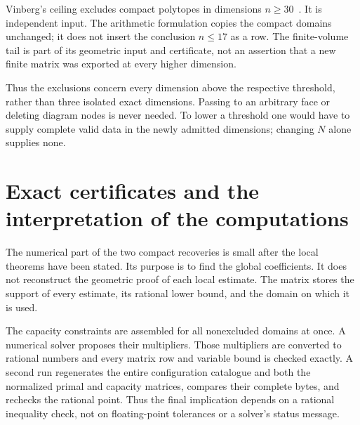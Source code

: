\documentclass[11pt]{article}
\theoremstyle{definition}
\theoremstyle{remark}
\numberwithin{equation}{section}
\begin{document}
Vinberg's ceiling excludes compact polytopes in dimensions
$n\ge30$~\cite{Vinberg1984,Vinberg1985}. It is independent input.
The arithmetic formulation copies the compact domains unchanged;
it does not insert the conclusion $n\le17$ as a row. The
finite-volume tail is part of its geometric input and certificate,
not an assertion that a new finite matrix was exported at every
higher dimension.

Thus the exclusions concern every dimension above the respective
threshold, rather than three isolated exact dimensions. Passing to
an arbitrary face or deleting diagram nodes is never needed.
To lower a threshold one would have to supply complete valid data in
the newly admitted dimensions; changing $N$ alone supplies none.

\section{Exact certificates and the interpretation of the computations}
\label{sec:certificates}

The numerical part of the two compact recoveries is small after the
local theorems have been stated. Its purpose is to find the global
coefficients. It does not reconstruct the geometric proof of each
local estimate. The matrix stores the support of every estimate,
its rational lower bound, and the domain on which it is used.

The capacity constraints are assembled for all nonexcluded domains
at once. A numerical solver proposes their multipliers. Those
multipliers are converted to rational numbers and every matrix row
and variable bound is checked exactly. A second run regenerates the
entire configuration catalogue and both the normalized primal and
capacity matrices, compares their complete bytes, and rechecks the
rational point. Thus the final implication depends on a rational
inequality check, not on floating-point tolerances or a solver's
status message.
\end{document}
